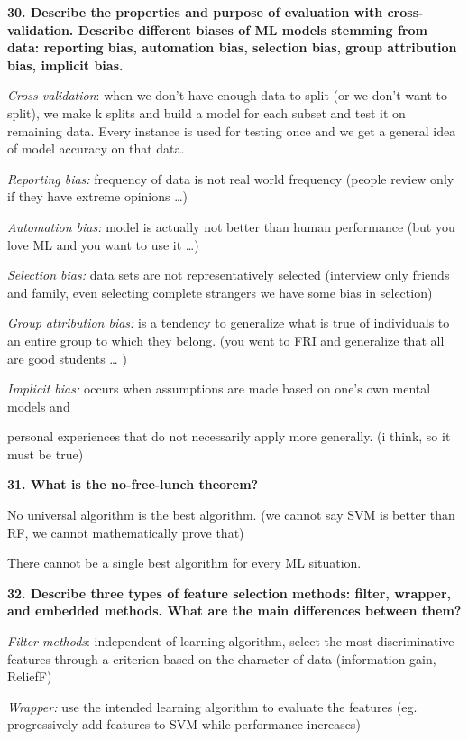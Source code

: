 \textbf{30. Describe the properties and purpose of evaluation with
cross-validation. Describe different biases of ML models stemming from
data: reporting bias, automation bias, selection bias, group attribution
bias, implicit bias.}

\textit{Cross-validation}: when we don't have enough data to split
(or we don't want to split), we make k splits and build a model for each
subset and test it on remaining data. Every instance is used for testing
once and we get a general idea of model accuracy on that data.

\textit{Reporting bias:} frequency of data is not real world
frequency (people review only if they have extreme opinions \ldots)

\textit{Automation bias:} model is actually not better than human
performance (but you love ML and you want to use it \ldots)

\textit{Selection bias:} data sets are not representatively selected
(interview only friends and family, even selecting complete strangers we
have some bias in selection)

\textit{Group attribution bias:} is a tendency to generalize what is
true of individuals to an entire group to which they belong. (you went
to FRI and generalize that all are good students \ldots{} )

\textit{Implicit bias:} occurs when assumptions are made based on
one's own mental models and

personal experiences that do not necessarily apply more generally. (i
think, so it must be true)

\textbf{31. What is the no-free-lunch theorem?}

No universal algorithm is the best algorithm. (we cannot say SVM is
better than RF, we cannot mathematically prove that)

There cannot be a single best algorithm for every ML situation.

\textbf{32. Describe three types of feature selection methods: filter,
wrapper, and embedded methods. What are the main differences between
them?}

\textit{Filter methods}: independent of learning algorithm, select
the most discriminative features through a criterion based on the
character of data (information gain, ReliefF)

\textit{Wrapper:} use the intended learning algorithm to evaluate the
features (eg. progressively add features to SVM while performance
increases)

